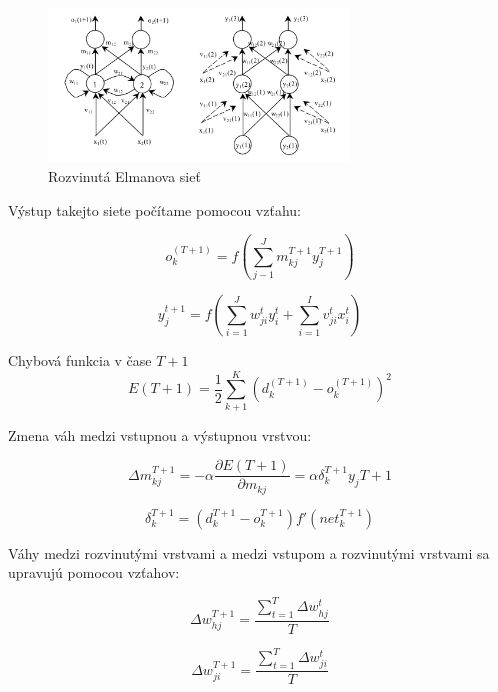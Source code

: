 \begin{figure}[H]
	\centering
	\includegraphics[width=8cm]{assets/elman}
	\caption{Rozvinutá Elmanova sieť}
\end{figure}


Výstup takejto siete počítame pomocou vzťahu:

\begin{equation}
	o_{k}^{(T+1)} = f(\sum_{j-1}^{J}m_{kj}^{T+1}y_{j}^{T+1})
\end{equation}

\begin{equation}
	y_{j}^{t+1} = f (\sum_{i=1}^{J}w_{ji}^{t}y_{i}^{t} + \sum_{i=1}^{I}v_{ji}^{t}x_{i}^{t})
\end{equation}

Chybová funkcia  v čase $T + 1$
\begin{equation}
	E(T+1) = \frac{1}{2} \sum_{k+1}^{K}(d_{k}^{(T+1)} - o_{k}^{(T+1)})^{2}
\end{equation}

Zmena váh medzi vstupnou a výstupnou vrstvou:

\begin{equation}
	\Delta m_{kj}^{T+1} = -\alpha\frac{\partial E(T+1)}{\partial m_{kj}} = \alpha \delta_{k}^{T+1}y_{j}{T+1}
\end{equation}

\begin{equation}
	\delta_{k}^{T+1} = (d_{k}^{T+1} - o_{k}^{T+1})f'(net_{k}^{T+1})
\end{equation}

Váhy medzi rozvinutými vrstvami a medzi vstupom a rozvinutými vrstvami sa upravujú pomocou vzťahov:

\begin{equation}
	\Delta w_{hj}^{T+1} = \frac{\sum_{t=1}^{T} \Delta w_{hj}^{t}}{T}
\end{equation}

\begin{equation}
	\Delta w_{ji}^{T+1} = \frac{\sum_{t=1}^{T} \Delta w_{ji}^{t}}{T}
\end{equation}



